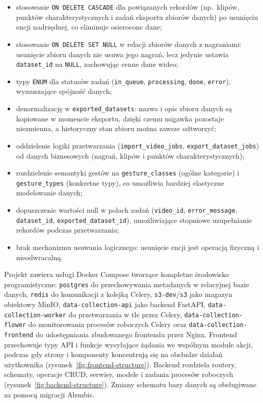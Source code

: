 \begin{itemize}
  \item stosowanie \texttt{ON DELETE CASCADE} dla powiązanych rekordów
        (np.\ klipów, punktów charakterystycznych i zadań eksportu zbiorów danych)
        po usunięciu encji nadrzędnej, co eliminuje osierocone dane;
  \item stosowanie \texttt{ON DELETE SET NULL} w relacji zbiorów danych
        z nagraniami: usunięcie zbioru danych nie usuwa jego nagrań, lecz jedynie
        ustawia \texttt{dataset\_id} na \texttt{NULL}, zachowując cenne dane wideo;
  \item typy \texttt{ENUM} dla statusów zadań (\texttt{in\_queue},
        \texttt{processing}, \texttt{done}, \texttt{error}), wymuszające spójność
        danych;
  \item denormalizację w \texttt{exported\_datasets}: nazwa i opis zbioru danych
        są kopiowane w momencie eksportu, dzięki czemu migawka pozostaje
        niezmienna, a historyczny stan zbioru można zawsze odtworzyć;
  \item oddzielenie logiki przetwarzania (\texttt{import\_video\_jobs},
        \texttt{export\_dataset\_jobs}) od danych biznesowych (nagrań, klipów
        i punktów charakterystycznych);
  \item rozdzielenie semantyki gestów na \texttt{gesture\_classes} (ogólne
        kategorie) i \texttt{gesture\_types} (konkretne typy), co umożliwia
        bardziej elastyczne modelowanie danych;
  \item dopuszczenie wartości null w polach zadań (\texttt{video\_id},
        \texttt{error\_message}, \texttt{dataset\_id},
        \texttt{exported\_dataset\_id}), umożliwiające stopniowe uzupełnianie
        rekordów podczas przetwarzania;
  \item brak mechanizmu usuwania logicznego: usunięcie encji jest operacją
        fizyczną i nieodwracalną.
\end{itemize}

Projekt zawiera usługi Docker Compose tworzące kompletne środowisko
programistyczne: \texttt{postgres} do przechowywania metadanych w relacyjnej
bazie danych, \texttt{redis} do komunikacji z kolejką Celery,
\texttt{s3-dev}/\texttt{s3} jako magazyn obiektowy MinIO,
\texttt{data-collection-api} jako backend FastAPI,
\texttt{data-collection-worker} do przetwarzania w tle przez Celery,
\texttt{data-collection-flower} do monitorowania procesów roboczych Celery oraz
\texttt{data-collection-frontend} do udostępniania zbudowanego frontendu przez
Nginx. Frontend przechowuje typy API i funkcje wysyłające żądania we wspólnym
module akcji, podczas gdy strony i komponenty koncentrują się na obsłudze działań
użytkownika (rysunek~\ref{fig:frontend-structure}). Backend rozdziela routery,
schematy, operacje CRUD, serwisy, modele i zadania procesów roboczych
(rysunek~\ref{fig:backend-structure}). Zmiany schematu bazy danych są obsługiwane
za pomocą migracji Alembic.

